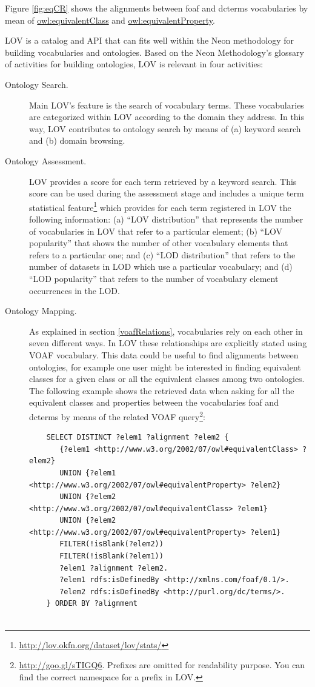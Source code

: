 \begin{description}
	Figure \ref{fig:eqCR} shows the alignments between foaf and dcterms vocabularies by mean of \url{owl:equivalentClass} and \url{owl:equivalentProperty}. 

LOV is a catalog and API that can fits well within the Neon methodology for building vocabularies and ontologies. Based on the Neon Methodology's glossary of activities for building ontologies, LOV is relevant in four activities:


\begin{description}

 \item [Ontology Search.] Main LOV's feature is the search of vocabulary terms. These vocabularies are categorized within LOV according to the domain they address. In this way, LOV contributes to ontology search by means of (a) keyword search and (b) domain browsing.
 \item [Ontology Assessment.] LOV provides a score for each term retrieved by a keyword search. This score can be used during the assessment stage and includes a unique term statistical feature\footnote{\url{http://lov.okfn.org/dataset/lov/stats/}} which provides for each term registered in LOV the following information: (a) ``LOV distribution'' that represents the number of vocabularies in LOV that refer to a particular element; (b) ``LOV popularity'' that shows the number of other vocabulary elements that refers to a particular one; and (c) ``LOD distribution'' that refers to the number of datasets in LOD which use a particular vocabulary; and (d) ``LOD popularity'' that refers to the number of vocabulary element occurrences in the LOD.
 \item [Ontology Mapping.] As explained in section \ref{voafRelations}, vocabularies rely on each other in seven different ways. In LOV these relationships are explicitly stated using VOAF vocabulary. This data could be useful to find alignments between ontologies, for example one user might be interested in finding equivalent classes for a given class or all the equivalent classes among two ontologies. The following example shows the retrieved data when asking for all the equivalent classes and properties between the vocabularies foaf and dcterms by means of the related VOAF query\footnote{\url{http://goo.gl/sTIGQ6}. Prefixes are omitted for readability purpose. You can find the correct namespace for a prefix in LOV.}:
     
\begin{lstlisting}
    SELECT DISTINCT ?elem1 ?alignment ?elem2 {
	   {?elem1 <http://www.w3.org/2002/07/owl#equivalentClass> ?elem2}
	   UNION {?elem1 <http://www.w3.org/2002/07/owl#equivalentProperty> ?elem2}
	   UNION {?elem2 <http://www.w3.org/2002/07/owl#equivalentClass> ?elem1}
	   UNION {?elem2 <http://www.w3.org/2002/07/owl#equivalentProperty> ?elem1}
	   FILTER(!isBlank(?elem2))
	   FILTER(!isBlank(?elem1))
	   ?elem1 ?alignment ?elem2.
	   ?elem1 rdfs:isDefinedBy <http://xmlns.com/foaf/0.1/>.
	   ?elem2 rdfs:isDefinedBy <http://purl.org/dc/terms/>.
	} ORDER BY ?alignment
	

\end{lstlisting}
\end{description}
\end{description}
